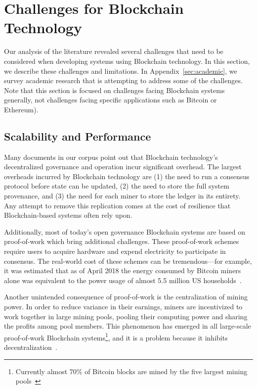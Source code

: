\section{Challenges for Blockchain Technology}
\label{sec:challenges}

Our analysis of the literature revealed several challenges that need to be considered when developing systems using Blockchain technology.
In this section, we describe these challenges and limitations.
In Appendix~\ref{sec:academic}, we survey academic research that is attempting to address some of the challenges.
Note that this section is focused on challenges facing Blockchain systems generally, not challenges facing specific applications such as Bitcoin or Ethereum).

\subsection{Scalability and Performance}
Many documents in our corpus point out that Blockchain technology's decentralized governance and operation incur significant overhead. The largest overheads incurred by Blockchain technology are (1) the need to run a consensus protocol before state can be updated, (2) the need to store the full system provenance, and (3) the need for each miner to store the ledger in its entirety. Any attempt to remove this replication comes at the cost of resilience that Blockchain-based systems often rely upon.

Additionally, most of today's open governance Blockchain systems are based on proof-of-work which bring additional challenges.
These proof-of-work schemes require users to acquire hardware and expend electricity to participate in consensus.
The real-world cost of these schemes can be tremendous---for example, it was estimated that as of April 2018 the energy consumed by Bitcoin miners alone was equivalent to the power usage of almost 5.5 million US households~\cite{Digiconomist}.

Another unintended consequence of proof-of-work is the centralization of mining power.  In order to reduce variance in their earnings, miners are incentivized to work together in large mining pools, pooling their computing power and sharing the profits among pool members. This phenomenon has emerged in all large-scale proof-of-work Blockchain systems\footnote{Currently almost 70\% of Bitcoin blocks are mined by the five largest mining pools~\cite{BlockchainInfoPools}}, and it is a problem because it inhibits decentralization~\cite{arxiv:GBERS18}.

